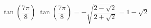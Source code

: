 {$\tan \left( \dfrac{7\pi}{8} \right)$}
{$\tan \left( \dfrac{7\pi}{8} \right) = -\sqrt{ \dfrac{2 - \sqrt{2}}{2 + \sqrt{2}} } =1-\sqrt{2}$}

